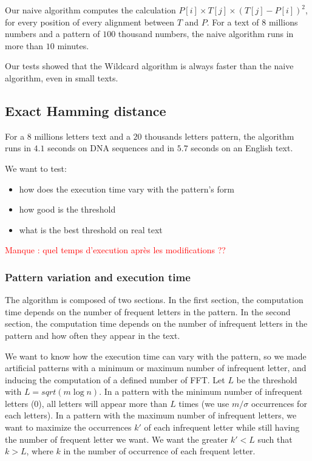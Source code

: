 \documentclass[preprint,12pt]{elsarticle}
\begin{document}
Our naive algorithm computes the calculation $P[i] \times T[j] \times (T[j]-P[i])^2$,
for every position of every alignment between $T$ and $P$.
For a text of $8$ millions numbers and a pattern of $100$ thousand numbers,
the naive algorithm runs in more than $10$ minutes.

Our tests showed that the Wildcard algorithm is always faster than the naive algorithm, even in small texts.





\subsection{Exact Hamming distance}


For a $8$ millions letters text and a $20$ thousands letters pattern, 
the algorithm runs in $4.1$ seconds on DNA sequences and in $5.7$ seconds on an English text.

We want to test:
\begin{itemize}
\setlength\itemsep{-0.4em}
\item how does the execution time vary with the pattern's form
\item how good is the threshold
\item what is the best threshold on real text
\end{itemize}

\textcolor{red}{Manque : quel temps d'execution après les modifications ??}



\subsubsection*{Pattern variation and execution time}

The algorithm is composed of two sections.
In the first section, the computation time depends
on the number of frequent letters in the pattern.
In the second section, the computation time depends on the number
of infrequent letters in the pattern and how often they appear in the text.

We want to know how the execution time can vary with the pattern,
so %
we made artificial patterns
with a minimum or maximum number of infrequent letter,
and inducing the computation of a defined number of FFT.
Let $L$ be the threshold with $L = sqrt(m \log n)$.
In a pattern with the minimum number of infrequent letters ($0$),
all letters will appear more than $L$ times
(we use $m/\sigma$ occurrences for each letters).
In a pattern with the maximum number of infrequent letters,
we want to maximize the occurrences $k'$ of each infrequent letter
while still having the number of frequent letter we want.
We want the greater $k'<L$ such that $k > L$,
where $k$ in the number of occurrence of each frequent letter.
\end{document}
